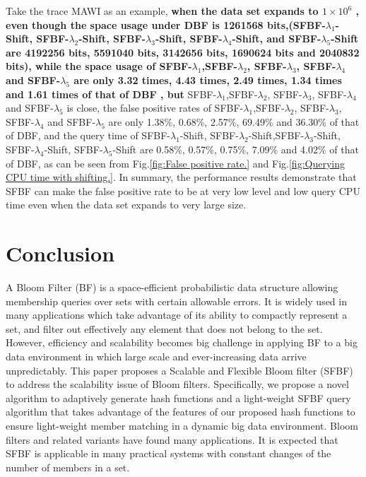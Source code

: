 \documentclass[10pt,journal,compsoc]{IEEEtran}
\newcommand{\rev}[1]{#1}
\newcommand{\DataSetSize}{$1 \times 10^6$ }
\begin{document}
Take the trace MAWI as an example, \textbf{when the data set expands to \DataSetSize, even though the space usage under DBF is 1261568 bits,(SFBF-$\lambda_1$-Shift, SFBF-$\lambda_2$-Shift, SFBF-$\lambda_3$-Shift, SFBF-$\lambda_4$-Shift, and SFBF-$\lambda_5$-Shift are 4192256 bits, 5591040 bits, 3142656 bits, 1690624 bits and 2040832 bits), while the space usage of SFBF-$\lambda_1$,SFBF-$\lambda_2$,  SFBF-$\lambda_3$, SFBF-$\lambda_4$ and SFBF-$\lambda_5$ are only 3.32 times,  4.43 times, 2.49 times, 1.34 times and 1.61 times of that of DBF , but } SFBF-$\lambda_1$,SFBF-$\lambda_2$,  SFBF-$\lambda_3$, SFBF-$\lambda_4$ and SFBF-$\lambda_5$ is close, the false positive rates of SFBF-$\lambda_1$,SFBF-$\lambda_2$,  SFBF-$\lambda_3$, SFBF-$\lambda_4$ and SFBF-$\lambda_5$ are only 1.38\%,  0.68\%, 2.57\%, 69.49\% and 36.30\% of that of DBF, and the query time of SFBF-$\lambda_1$-Shift,  SFBF-$\lambda_2$-Shift,SFBF-$\lambda_3$-Shift, SFBF-$\lambda_4$-Shift, SFBF-$\lambda_5$-Shift are 0.58\%, 0.57\%, 0.75\%, 7.09\% and 4.02\% of that of DBF, as can be seen from Fig.\ref{fig:False positive rate.} and Fig.\ref{fig:Querying CPU time with shifting.}.
In summary, the performance results demonstrate that SFBF \rev{can make}  the false positive rate to be at very low level and low query CPU time even when the data set expands to very large size.




\section{Conclusion}
\label{sec:CONCLUSION}
A Bloom Filter (BF) is a space-efficient probabilistic data structure allowing membership queries over
sets with certain allowable errors. It is widely used in many applications which take advantage of
its ability to compactly represent a set, and filter out effectively any element that does not belong
to the set. However, efficiency and scalability becomes big challenge in applying BF to a big data environment in which large scale and ever-increasing data arrive unpredictably. This paper proposes a  Scalable and Flexible Bloom
filter (SFBF) to address the scalability issue of Bloom filters. Specifically, we propose a novel algorithm to adaptively generate hash functions and a light-weight SFBF query algorithm that takes advantage of the features of our proposed hash functions to ensure light-weight member matching in a dynamic big data environment. Bloom filters and related variants have found many applications. It is expected that SFBF is applicable in many practical systems with constant changes of the number of members in a set.
\end{document}
